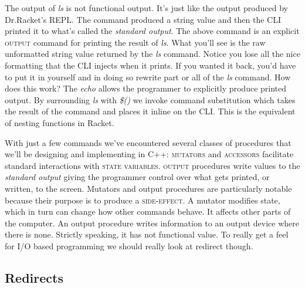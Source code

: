 \documentclass[nobib]{tufte-handout}
\begin{document}
\begin{enumerate}
The output of \textit{ls} is not functional output. It's just like the output produced by Dr.Racket's REPL\@. The command produced a string value and then the CLI printed it to what's called the \textit{standard output}. The above command is an explicit \textsc{output} command for printing the result of \textit{ls}. What you'll see is the raw unformatted string value returned by the \textit{ls} command. Notice you lose all the nice formatting that the CLI injects when it prints. If you wanted it back, you'd have to put it in yourself and in doing so rewrite part or all of the \textit{ls} command. How does this work? The \textit{echo} allows the programmer to explicitly produce printed output. By surrounding \textit{ls} with \textit{\$()} we invoke command substitution which takes the result of the command and places it inline on the CLI\@. This is the equivalent of nesting functions in Racket.

\end{enumerate}

With just a few commands we've encountered several classes of procedures that we'll be designing and implementing in C++: \textsc{mutators} and \textsc{accessors} facilitate standard interactions with \textsc{state variables}. \textsc{output} procedures write values to the \textit{standard output} giving the programmer control over what gets printed, or written, to the screen. Mutators and output procedures are particularly notable because their purpose is to produce a \textsc{side-effect}. A mutator modifies state, which in turn can change how other commands behave. It affects other parts of the computer. An output procedure writes information to an output device where there is none. Strictly speaking, it has not functional value.  To really get a feel for I/O based programming we should really look at redirect though.

\subsection{Redirects}
\end{document}
